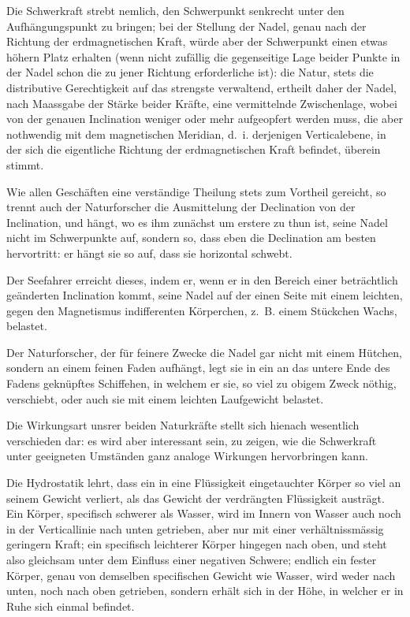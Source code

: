 \documentclass[12pt,a4paper]{article}
\begin{document}
Die Schwerkraft strebt nemlich, den Schwerpunkt senkrecht unter den Aufhängungspunkt zu bringen; bei der Stellung der Nadel, genau nach der Richtung der erdmagnetischen Kraft, würde aber der Schwerpunkt einen etwas höhern Platz erhalten (wenn nicht zufällig die gegenseitige Lage beider Punkte in der Nadel schon die zu jener Richtung erforderliche ist): die Natur, stets die distributive Gerechtigkeit auf das strengste verwaltend, ertheilt daher der Nadel, nach Maassgabe der Stärke beider Kräfte, eine vermittelnde Zwischenlage, wobei von der genauen Inclination weniger oder mehr aufgeopfert werden muss, die aber nothwendig mit dem magnetischen Meridian, d.~i. derjenigen Verticalebene, in der sich die eigentliche Richtung der erdmagnetischen Kraft befindet, überein stimmt.

Wie allen Geschäften eine verständige Theilung stets zum Vortheil gereicht, so trennt auch der Naturforscher die Ausmittelung der Declination von der Inclination, und hängt, wo es ihm zunächst um erstere zu thun ist, seine Nadel nicht im Schwerpunkte auf, sondern so, dass eben die Declination am besten hervortritt: er hängt sie so auf, dass sie horizontal schwebt.

Der Seefahrer erreicht dieses, indem er, wenn er in den Bereich einer beträchtlich geänderten Inclination kommt, seine Nadel auf der einen Seite mit einem leichten, gegen den Magnetismus indifferenten Körperchen, z.~B. einem Stückchen Wachs, belastet.

Der Naturforscher, der für feinere Zwecke die Nadel gar nicht mit einem Hütchen, sondern an einem feinen Faden aufhängt, legt sie in ein an das untere Ende des Fadens geknüpftes Schiffehen, in welchem er sie, so viel zu obigem Zweck nöthig, verschiebt, oder auch sie mit einem leichten Laufgewicht belastet.

\bigskip

Die Wirkungsart unsrer beiden Naturkräfte stellt sich hienach wesentlich verschieden dar: es wird aber interessant sein, zu zeigen, wie die Schwerkraft unter geeigneten Umständen ganz analoge Wirkungen hervorbringen kann.

Die Hydrostatik lehrt, dass ein in eine Flüssigkeit eingetauchter Körper so viel an seinem Gewicht verliert, als das Gewicht der verdrängten Flüssigkeit austrägt. Ein Körper, specifisch schwerer als Wasser, wird im Innern von Wasser auch noch in der Verticallinie nach unten getrieben, aber nur mit einer verhältnissmässig geringern Kraft; ein specifisch leichterer Körper hingegen nach oben, und steht also gleichsam unter dem Einfluss einer negativen Schwere; endlich ein fester Körper, genau von demselben specifischen Gewicht wie Wasser, wird weder nach unten, noch nach oben getrieben, sondern erhält sich in der Höhe, in welcher er in Ruhe sich einmal befindet.
\end{document}
